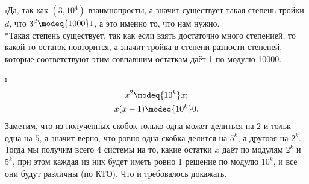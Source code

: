 \i Да, так как $(3, 10^4)$ взаимнопросты, а значит существует такая степень тройки $d$, что $3^d \modeq{1000} 1$, а это именно то, что нам нужно.\\
*Такая степень существует, так как если взять достаточно много степенией, то какой-то остаток повторится, а значит тройка в степени разности степеней, которые соответствуют этим совпавшим остаткам даёт 1 по модулю 10000.

\i
\begin{gather*}
    x^2 \modeq{10^k} x;\\
    x(x-1) \modeq{10^k} 0.
\end{gather*}
Заметим, что из полученных скобок только одна может делиться на $2$ и тольк одна на $5$, а значит верно, что ровно одна скобка делится на $5^k$, а другоая на $2^k$. Тогда мы получим всего 4 системы на то, какие остатки $x$ даёт по модулям $2^k$ и $5^k$, при этом каждая из них будет иметь ровно 1 решение по модулю $10^k$, и все они будут различны (по КТО). Что и требовалось докажать.
